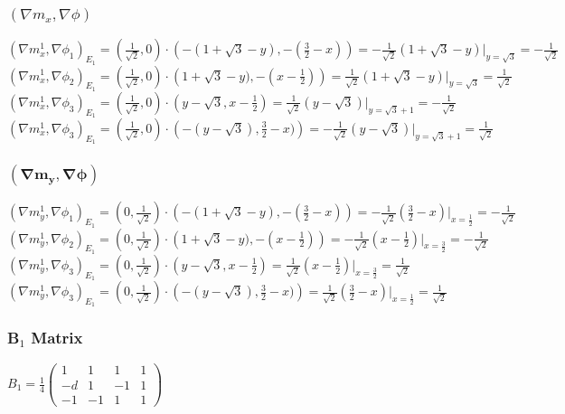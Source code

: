 \documentclass{article}
\begin{document}
\subsubsection{$(\nabla m_x,\nabla\phi)$}
$(\nabla m_x^1,\nabla\phi_1)_{E_1} = 
\left(\frac{1}{\sqrt{2}},0\right)\cdot\left(-(1 + \sqrt{3} - y),  -(\frac{3}{2}-x)\right) = 
-\frac{1}{\sqrt{2}}(1 + \sqrt{3} - y)|_{y=\sqrt{3}} = 
-\frac{1}{\sqrt{2}}$\\
$(\nabla m_x^1,\nabla\phi_2)_{E_1} = 
\left(\frac{1}{\sqrt{2}},0\right)\cdot\left(1 + \sqrt{3} - y),  -(x-\frac{1}{2})\right) = 
\frac{1}{\sqrt{2}}(1 + \sqrt{3} - y)|_{y=\sqrt{3}} = 
\frac{1}{\sqrt{2}}$\\
$(\nabla m_x^1,\nabla\phi_3)_{E_1} = 
\left(\frac{1}{\sqrt{2}},0\right)\cdot\left(y-\sqrt{3}, x-\frac{1}{2}\right) = 
\frac{1}{\sqrt{2}}(y-\sqrt{3})|_{y=\sqrt{3}+1} = 
-\frac{1}{\sqrt{2}}$\\
$(\nabla m_x^1,\nabla\phi_3)_{E_1} = 
\left(\frac{1}{\sqrt{2}},0\right)\cdot\left(-(y-\sqrt{3}), \frac{3}{2}-x)\right) = 
-\frac{1}{\sqrt{2}}(y-\sqrt{3})|_{y=\sqrt{3}+1} = 
\frac{1}{\sqrt{2}}$\\


\subsubsection{$\mathbf{(\nabla m_y,\nabla\phi)}$}
$(\nabla m_y^1,\nabla\phi_1)_{E_1} = 
\left(0,\frac{1}{\sqrt{2}}\right)\cdot\left(-(1 + \sqrt{3} - y),  -(\frac{3}{2}-x)\right) = 
-\frac{1}{\sqrt{2}}(\frac{3}{2}-x)|_{x=\frac{1}{2}} = 
-\frac{1}{\sqrt{2}}$\\
$(\nabla m_y^1,\nabla\phi_2)_{E_1} = 
\left(0,\frac{1}{\sqrt{2}}\right)\cdot\left(1 + \sqrt{3} - y),  -(x-\frac{1}{2})\right) = 
-\frac{1}{\sqrt{2}}(x - \frac{1}{2})|_{x=\frac{3}{2}} = 
-\frac{1}{\sqrt{2}}$\\
$(\nabla m_y^1,\nabla\phi_3)_{E_1} = 
\left(0,\frac{1}{\sqrt{2}}\right)\cdot\left(y-\sqrt{3}, x-\frac{1}{2}\right) = 
\frac{1}{\sqrt{2}}(x-\frac{1}{2})|_{x=\frac{3}{2}} = 
\frac{1}{\sqrt{2}}$\\
$(\nabla m_y^1,\nabla\phi_3)_{E_1} = 
\left(0,\frac{1}{\sqrt{2}}\right)\cdot\left(-(y-\sqrt{3}), \frac{3}{2}-x)\right) = 
\frac{1}{\sqrt{2}}(\frac{3}{2}-x)|_{x=\frac{1}{2}} = 
\frac{1}{\sqrt{2}}$\\

\subsubsection{B$_1$ Matrix}
$B_1 = \frac{1}{4}\begin{pmatrix}
    1 & 1 & 1 & 1 \\
    -d & 1 & -1 & 1\\
    -1 & -1 & 1 & 1 
\end{pmatrix}$
\end{document}
